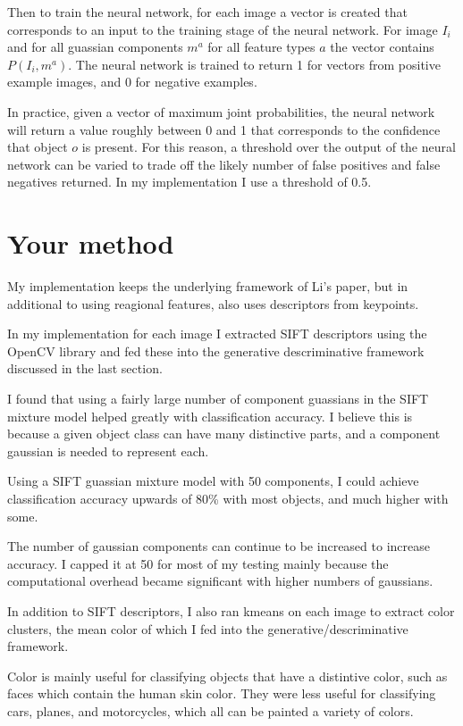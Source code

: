 \documentclass[11pt]{article}
\begin{document}
Then to train the neural network, for each image a vector is created
that corresponds to an input to the training stage of the neural
network. For image $I_i$ and for all guassian components $m^a$ for all
feature types $a$ the vector contains $P(I_i, m^a)$. The neural
network is trained to return 1 for vectors from positive example
images, and 0 for negative examples.

In practice, given a vector of maximum joint probabilities, the neural
network will return a value roughly between 0 and 1 that corresponds
to the confidence that object $o$ is present. For this reason, a
threshold over the output of the neural network can be varied to trade
off the likely number of false positives and false negatives
returned. In my implementation I use a threshold of 0.5.

\section{Your method}

My implementation keeps the underlying framework of Li's paper, but in
additional to using reagional features, also uses descriptors from
keypoints.

In my implementation for each image I extracted SIFT\cite{sift}
descriptors using the OpenCV library and fed these into the generative
descriminative framework discussed in the last section.

I found that using a fairly large number of component guassians in the
SIFT mixture model helped greatly with classification accuracy. I believe this
is because a given object class can have many distinctive parts, and a
component gaussian is needed to represent each.

Using a SIFT guassian mixture model with 50 components, I could
achieve classification accuracy upwards of 80\%  with most objects,
and much higher with some.

The number of gaussian components can continue to be increased to
increase accuracy. I capped it at 50 for most of my testing mainly
because the computational overhead became significant with higher
numbers of gaussians.

In addition to SIFT descriptors, I also ran kmeans on each image to
extract color clusters, the mean color of which I fed into the
generative/descriminative framework.

Color is mainly useful for classifying objects that have a distintive
color, such as faces which contain the human skin color. They were
less useful for classifying cars, planes, and motorcycles, which
all can be painted a variety of colors.
\end{document}
